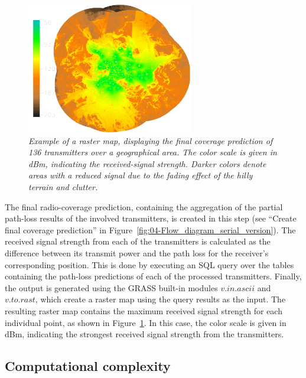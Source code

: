 \begin{figure}
\centering

\includegraphics[width=0.65\textwidth]{04-framework_design_and_implementation/img/final_coverage}

\caption{\textit{\emph{Example of a raster map, displaying the final coverage
prediction of 136 transmitters over a geographical area. The color
scale is given in dBm, indicating the received-signal strength. Darker
colors denote areas with a reduced signal due to the fading effect
of the hilly terrain and clutter. \label{fig:04-Raster_prediction_example}}}}
\end{figure}


The final radio-coverage prediction, containing the aggregation of
the partial path-loss results of the involved transmitters, is created
in this step (see ``Create final coverage prediction'' in Figure~\ref{fig:04-Flow_diagram_serial_version}).
The received signal strength from each of the transmitters is calculated
as the difference between its transmit power and the path loss for
the receiver's corresponding position. This is done by executing an
SQL query over the tables containing the path-loss predictions of
each of the processed transmitters. Finally, the output is generated
using the GRASS built-in modules $v.in.ascii$ and $v.to.rast$, which
create a raster map using the query results as the input. The resulting
raster map contains the maximum received signal strength for each
individual point, as shown in Figure~\ref{fig:04-Raster_prediction_example}.
In this case, the color scale is given in dBm, indicating the strongest
received signal strength from the transmitters.


\subsection{Computational complexity \label{sub:04-Computational_complexity}}

